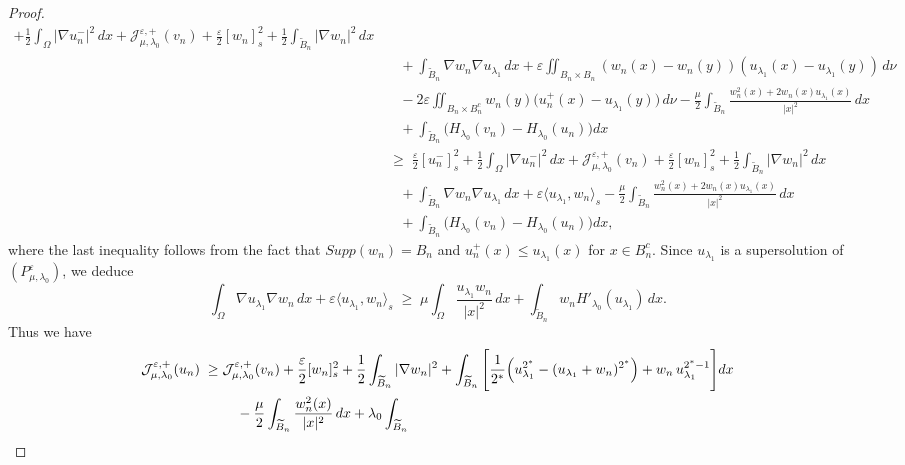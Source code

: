 \documentclass[11pt]{article}
\newcommand{\la} {\lambda}
\newcommand{\Jepo}{\mathcal{J}_{\mu, \lambda_0}^{\varepsilon,+}}
\begin{document}
\begin{proof}
\begin{equation*}
\begin{aligned}
+ \frac{1}{2}\int_{\Omega} |\nabla u_n^-|^2 \, dx 
+ \Jepo(v_n) 
+ \frac{\varepsilon}{2}[w_n]_s^2 + \frac{1}{2}\int_{\widetilde{B}_n} |\nabla w_n|^2 \, dx\\
&\quad 
+  \int_{\widetilde{B}_n} \nabla w_n  \nabla u_{\lambda_1} \, dx + \varepsilon\iint_{B_n \times B_n} (w_n(x)-w_n(y))(u_{\lambda_1}(x)-u_{\lambda_1}(y)) \, d\nu \\
&\quad - 2\varepsilon \iint_{B_n \times B_n^c}
w_n(y)\big(u_n^+(x)-u_{\lambda_1}(y)\big) \, d\nu  - \frac{\mu}{2} \int_{\widetilde{B}_n} \frac{w_n^2(x) + 2 w_n(x) u_{\lambda_1}(x)}{|x|^2} \, dx \\
&\quad + \int_{\widetilde{B}_n} \big( H_{\lambda_0}(v_n) - H_{\lambda_0}(u_n) \big) dx \\
&\;\geq\; \frac{\varepsilon}{2}[u_n^-]_s^2 
+ \frac{1}{2}\int_{\Omega} |\nabla u_n^-|^2 \, dx 
+ \Jepo(v_n) 
+ \frac{\varepsilon}{2}[w_n]_s^2 + \frac{1}{2}\int_{\widetilde{B}_n} |\nabla w_n|^2 \, dx\\
&\quad 
+  \int_{\widetilde{B}_n} \nabla w_n  \nabla u_{\lambda_1} \, dx + \varepsilon \langle u_{\la_1}, w_n \rangle_s  - \frac{\mu}{2} \int_{\widetilde{B}_n} \frac{w_n^2(x) + 2 w_n(x) u_{\lambda_1}(x)}{|x|^2} \, dx \\
&\quad + \int_{\widetilde{B}_n} \big( H_{\lambda_0}(v_n) - H_{\lambda_0}(u_n) \big) dx,
\end{aligned}
\end{equation*}
where the last inequality follows from the fact that $Supp (w_n) = B_n$ and $u_n^+(x) \leq u_{\la_1}(x)$ for $x \in B_n^c$.
Since $u_{\lambda_1}$ is a supersolution of $(P_{\mu, \lambda_0}^{\varepsilon})$, we deduce
\begin{equation*}
\int_{\Omega} \nabla u_{\lambda_1}  \nabla w_n \, dx 
+ \varepsilon \langle u_{\lambda_1}, w_n \rangle_s 
\;\geq\; 
\mu \int_{\Omega} \frac{u_{\lambda_1} w_n}{|x|^2} \, dx 
+ \int_{\widetilde{B}_n} w_n H'_{\lambda_0}(u_{\lambda_1}) \, dx .
\end{equation*}
Thus we have
\begin{align}
\Jepo(u_n) \;\geq\;& \Jepo(v_n) + \frac{\varepsilon}{2} [w_n]_{s}^{2} 
+ \frac{1}{2} \int_{\widetilde{B}_n} |\nabla w_n|^2 
 +\int_{\widetilde{B}_n} \Bigg[ \frac{1}{2^*} \Big( u_{\lambda_1}^{2^*} - (u_{\lambda_1}+w_n)^{2^*} \Big) 
+ w_n \, u_{\lambda_1}^{2^*-1} \Bigg] dx \notag \\
& \quad - \frac{\mu}{2} \int_{\widetilde{B}_n} \frac{w_n^2(x)}{|x|^2} \, dx  + \lambda_0 \int_{\widetilde{B}_n} 

\end{align}
\end{proof}
\end{document}
